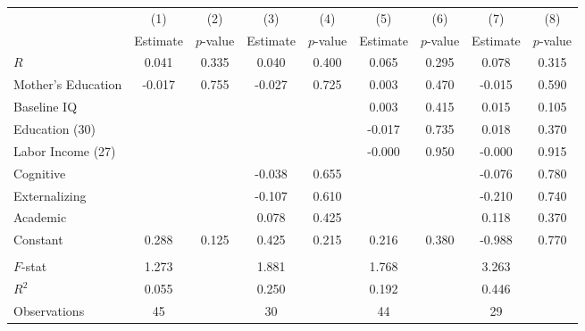 \begin{tabular}{lcccccccc} \toprule
 & (1) & (2) & (3) & (4) & (5) & (6) & (7) & (8) \\ 
 & Estimate  & $p$-value  & Estimate  & $p$-value  & Estimate  & $p$-value  & Estimate  & $p$-value  \\  \midrule
$R$ &     0.041 &     0.335 &     0.040 &     0.400 &     0.065 &     0.295 &     0.078 &     0.315 \\  
Mother's Education &    -0.017 &     0.755 &    -0.027 &     0.725 &     0.003 &     0.470 &    -0.015 &     0.590 \\  
Baseline IQ &         &         &         &         &     0.003 &     0.415 &     0.015 &     0.105 \\  
Education (30) &         &         &         &         &    -0.017 &     0.735 &     0.018 &     0.370 \\  
Labor Income (27) &         &         &         &         &    -0.000 &     0.950 &    -0.000 &     0.915 \\  
Cognitive &         &         &    -0.038 &     0.655 &         &         &    -0.076 &     0.780 \\  
Externalizing &         &         &    -0.107 &     0.610 &         &         &    -0.210 &     0.740 \\  
Academic &         &         &     0.078 &     0.425 &         &         &     0.118 &     0.370 \\  
Constant &     0.288 &     0.125 &     0.425 &     0.215 &     0.216 &     0.380 &    -0.988 &     0.770 \\ \\ \midrule
$F$-stat &     1.273 &         &     1.881 &         &     1.768 &         &     3.263 &         \\  
$R^2$ &     0.055 &         &     0.250 &         &     0.192 &         &     0.446 &         \\  
Observations &    45 &         &    30 &         &    44 &         &    29 &         \\  
\bottomrule
\end{tabular}

